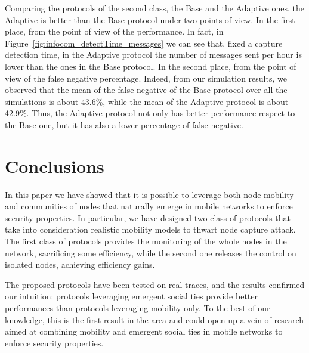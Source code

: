 \documentclass{IEEEconf}
\begin{document}
Comparing the protocols of the second class, the Base and the Adaptive ones, the Adaptive is better than the Base protocol under two points of view. In the first place, from the point of view of the performance. In fact, in Figure~\ref{fig:infocom_detectTime_messages} we can see that, fixed a capture detection time, in the Adaptive protocol the number of messages sent per hour is lower than the ones in the Base protocol. In the second place, from the point of view of the false negative percentage. Indeed, from our simulation results, we observed that the mean of the false negative of the Base protocol over all the simulations is about 43.6\%, while the mean of the Adaptive protocol is about
42.9\%.
Thus, the Adaptive protocol not only has better performance respect to the Base one, but it has also a lower percentage of false negative.















\section{Conclusions}
\label{conclusions}

In this paper we have showed that it is possible to leverage both node mobility and communities of nodes that naturally emerge in mobile networks to enforce security properties. In particular, we have designed two class of protocols that take into consideration realistic mobility models to thwart node capture attack.
The first class of protocols provides the monitoring of the whole nodes in the network, sacrificing some efficiency,
while the second one releases the control on isolated nodes, achieving efficiency gains.

The proposed protocols have been tested on real traces, and the results confirmed our intuition: protocols leveraging emergent social ties provide better performances
than protocols leveraging mobility only.
To the best of our knowledge, this is the first result in the area and could open up a vein of research aimed at combining mobility and emergent social ties in mobile networks to enforce  security properties.




\balance

















\newpage
\end{document}
